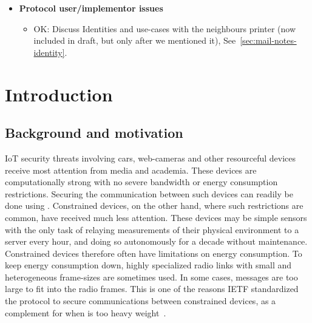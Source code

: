 \documentclass[runningheads,draft]{llncs}
\begin{document}
{\begin{itemize}
\begin{itemize}
\begin{itemize}
                confirmation and hence explicit inj-agree also for $I$.
                \item Discuss Transcipt hashes that lag behind one message and that
                it is supposed to "cover as much as possible", but sometimes
                does not (check tamarin model also for inconsistencies between
                methods). Unclear design except "as much as possible".
                \end{itemize}
            \item{\textbf{Protocol user/implementor issues}}
                \begin{itemize}
                \item OK: Discuss Identities and use-cases with the neighbours printer
                (now included in draft, but only after we mentioned it),
                See~\ref{sec:mail-notes-identity}.
                \end{itemize}
        \end{itemize}
\end{itemize}
}

\section{Introduction}
\label{sec:introduction}
\subsection{Background and motivation}
\label{sec:motivation}
IoT security threats involving cars, web-cameras and other resourceful devices
receive most attention from media and academia.
%
These devices are computationally strong with no severe bandwidth or energy
consumption restrictions.
%
Securing the communication between such devices can readily be done using
\mDandTls.
%
Constrained devices, on the other hand, where such restrictions are common,
have received much less attention.
%
These devices may be simple sensors with the only task of relaying
measurements of their physical environment to a server every hour, and doing so
autonomously for a decade without maintenance.
%
Constrained devices therefore often have limitations on energy consumption.
%
To keep energy consumption down, highly specialized radio links with small
and heterogeneous frame-sizes are sometimes used.
%
In some cases, \mDandTls{} messages are too large to fit into the radio frames.
%
This is one of the reasons IETF standardized the \mOscore{} protocol to secure
communications between constrained devices, as a complement for when
\mDandTls{} is too heavy weight~\cite{rfc8613}.
%
\end{document}
